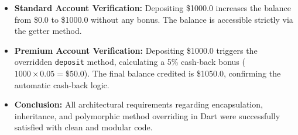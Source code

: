 \documentclass[11pt,a4paper]{article}
\begin{document}
\begin{itemize}
    \setlength{\itemsep}{5pt}
    \item \textbf{Standard Account Verification:} Depositing \$1000.0 increases the balance from \$0.0 to \$1000.0 without any bonus. The balance is accessible strictly via the getter method.
    \item \textbf{Premium Account Verification:} Depositing \$1000.0 triggers the overridden \texttt{deposit} method, calculating a 5\% cash-back bonus ($1000 \times 0.05 = \$50.0$). The final balance credited is \$1050.0, confirming the automatic cash-back logic.
    \item \textbf{Conclusion:} All architectural requirements regarding encapsulation, inheritance, and polymorphic method overriding in Dart were successfully satisfied with clean and modular code.
\end{itemize}
\end{document}
